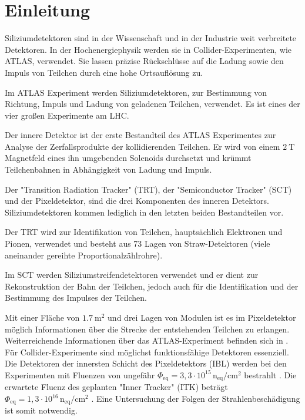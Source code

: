 \chapter{Einleitung}
Siliziumdetektoren sind in der Wissenschaft und in der Industrie weit verbreitete
Detektoren. In der Hochenergiephysik werden sie in Collider-Experimenten, wie ATLAS, verwendet.
Sie  lassen präzise Rückschlüsse auf die Ladung sowie den Impuls von Teilchen durch eine
hohe Ortsauflösung zu.


Im ATLAS Experiment werden Siliziumdetektoren, zur Bestimmung von Richtung, Impuls
und Ladung von geladenen Teilchen, verwendet. Es ist eines der vier großen Experimente am LHC.

Der innere Detektor ist der erste Bestandteil des ATLAS Experimentes zur Analyse der Zerfallsprodukte der
kollidierenden Teilchen. Er
wird von einem $\SI{2}{\tesla}$ Magnetfeld eines ihn umgebenden Solenoids
durchsetzt und krümmt Teilchenbahnen in Abhängigkeit von Ladung und Impuls.

Der "Transition Radiation Tracker" (TRT), der "Semiconductor Tracker" (SCT) und
der Pixeldetektor, sind die drei Komponenten
des inneren Detektors. Siliziumdetektoren kommen lediglich in den letzten beiden Bestandteilen vor.

Der TRT wird zur Identifikation von Teilchen, hauptsächlich Elektronen und Pionen, verwendet und besteht aus 73 Lagen
von Straw-Detektoren (viele aneinander gereihte Proportionalzählrohre).

Im SCT werden Siliziumstreifendetektoren verwendet und er dient zur
Rekonstruktion der Bahn der Teilchen, jedoch auch für die Identifikation und der Bestimmung des Impulses der Teilchen.

Mit einer Fläche von $\SI{1.7}{\meter\squared}$ und drei Lagen von Modulen
ist es im Pixeldetektor möglich
Informationen über die Strecke der entstehenden Teilchen zu erlangen.
Weiterreichende Informationen über das ATLAS-Experiment befinden sich in \cite{ATLAS}.
Für Collider-Experimente sind möglichst funktionsfähige Detektoren essenziell.
Die Detektoren der innersten Schicht des Pixeldetektors (IBL)
werden bei den Experimenten mit Fluenzen von ungefähr $\Phi_{\mathrm{eq}} =3,3\cdot 10^{15} \, \mathrm{n_{eq}/cm^2}$ bestrahlt \cite{Capeans:1291633}.
Die erwartete Fluenz des geplanten "Inner Tracker" (ITK) beträgt
$\Phi_{\mathrm{eq}} =1,3\cdot 10^{16} \, \mathrm{n_{eq}/cm^2}$ \cite{itk}. Eine Untersuchung
der Folgen der Strahlenbeschädigung ist somit notwendig.

